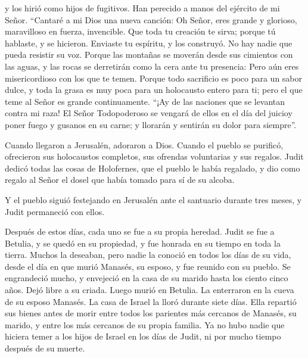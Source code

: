 y los hirió como hijos de fugitivos. Han perecido a manos del ejército
de mi Señor.  ``Cantaré a mi Dios una nueva canción: Oh
Señor, eres grande y glorioso, maravilloso en fuerza, invencible.
 Que toda tu creación te sirva; porque tú hablaste, y se
hicieron. Enviaste tu espíritu, y los construyó. No hay nadie que pueda
resistir su voz.  Porque las montañas se moverán desde
sus cimientos con las aguas, y las rocas se derretirán como la cera ante
tu presencia: Pero aún eres misericordioso con los que te temen.
 Porque todo sacrificio es poco para un sabor dulce, y
toda la grasa es muy poca para un holocausto entero para ti; pero el que
teme al Señor es grande continuamente.  ``¡Ay de las
naciones que se levantan contra mi raza! El Señor Todopoderoso se
vengará de ellos en el día del juicioy poner fuego y gusanos en su
carne; y llorarán y sentirán su dolor para siempre''.

 Cuando llegaron a Jerusalén, adoraron a Dios. Cuando el
pueblo se purificó, ofrecieron sus holocaustos completos, sus ofrendas
voluntarias y sus regalos.  Judit dedicó todas las cosas
de Holofernes, que el pueblo le había regalado, y dio como regalo al
Señor el dosel que había tomado para sí de su alcoba.

 Y el pueblo siguió festejando en Jerusalén ante el
santuario durante tres meses, y Judit permaneció con ellos.

 Después de estos días, cada uno se fue a su propia
heredad. Judit se fue a Betulia, y se quedó en su propiedad, y fue
honrada en su tiempo en toda la tierra.  Muchos la
deseaban, pero nadie la conoció en todos los días de su vida, desde el
día en que murió Manasés, su esposo, y fue reunido con su pueblo.
 Se engrandeció mucho, y envejeció en la casa de su
marido hasta los ciento cinco años. Dejó libre a su criada. Luego murió
en Betulia. La enterraron en la cueva de su esposo Manasés.
 La casa de Israel la lloró durante siete días. Ella
repartió sus bienes antes de morir entre todos los parientes más
cercanos de Manasés, su marido, y entre los más cercanos de su propia
familia.  Ya no hubo nadie que hiciera temer a los hijos
de Israel en los días de Judit, ni por mucho tiempo después de su
muerte.
